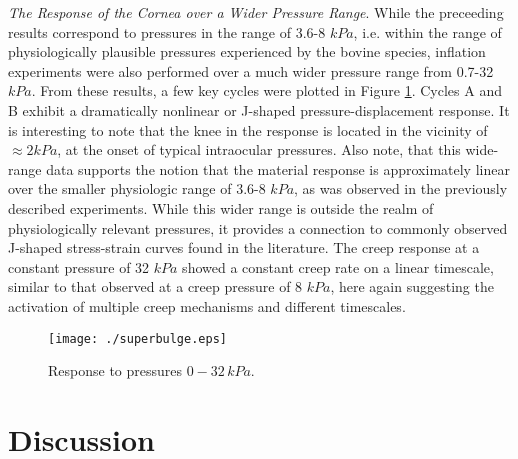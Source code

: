 \documentclass[11pt,oneside]{elsart}
\newcommand{\figref}[1]{Figure \ref{#1}}
\begin{document}
{\it The Response of the Cornea over a Wider Pressure Range}.
While the preceeding results correspond to pressures in the range of 3.6-8 $kPa$, i.e. within the range of physiologically plausible pressures experienced by the bovine species, inflation experiments were also performed over a much wider pressure range from 0.7-32 $kPa$.  From these results, a few key cycles were plotted in \figref{fig:superbulge}.  Cycles A and B exhibit a dramatically nonlinear or J-shaped pressure-displacement response.  It is interesting to note that the knee in the response is located in the vicinity of $\approx 2 kPa$, at the onset of typical intraocular pressures.  Also note, that this wide-range data supports the notion that the material response is approximately linear over the smaller physiologic range of 3.6-8 $kPa$, as was observed in the previously described experiments.  While this wider range is outside the realm of physiologically relevant pressures, it provides a connection to commonly observed J-shaped stress-strain curves found in the literature.  The creep response at a constant pressure of 32 $kPa$ showed a constant creep rate on a linear timescale, similar to that observed at a creep pressure of 8 $kPa$, here again suggesting the activation of multiple creep mechanisms and different timescales. 
%
\begin{figure}[hptb]
\begin{center}
  \resizebox{\textwidth}{!}
{\texttt{[image: ./superbulge.eps]}}
  \caption{Response to pressures $0-32 \, kPa$.}
  \label{fig:superbulge}
\end{center}
\end{figure}


\section{Discussion}
\label{sec:bulge_discussion}
\end{document}
